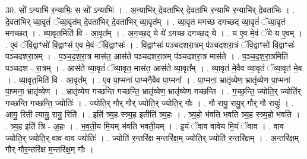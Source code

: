 \documentclass[17pt]{extarticle}
\begin{document}
30. सो᳚ ऽन्याभि॑ र॒न्याभिः॒ स सो᳚ ऽन्याभिः॑ । . अ॒न्याभि॑र् दे॒वता॑भिर् दे॒वता॑भि र॒न्याभि॑ र॒न्याभि॑र् दे॒वता॑भिः । . दे॒वता॑भिर् व्या॒वृतं॑ ॅव्या॒वृत॑म् दे॒वता॑भिर् दे॒वता॑भिर् व्या॒वृत᳚म् । . व्या॒वृत॑ मगच्छ दगच्छद् व्या॒वृतं॑ ॅव्या॒वृत॑ मगच्छत् । . व्या॒वृत॒मिति॑ वि - आ॒वृत᳚म् । . अ॒ग॒च्छ॒द् ये ये॑ ऽगच्छ दगच्छ॒द् ये । . य ए॒व मे॒वं ॅये य ए॒वम् । . ए॒वं ॅवि॒द्वाꣳसो॑ वि॒द्वाꣳस॑ ए॒व मे॒वं ॅवि॒द्वाꣳसः॑ । . वि॒द्वाꣳसः॑ पञ्चदशरा॒त्रम् प॑ञ्चदशरा॒त्रं ॅवि॒द्वाꣳसो॑ वि॒द्वाꣳसः॑ पञ्चदशरा॒त्रम् । . प॒ञ्च॒द॒श॒रा॒त्र मास॑त॒ आस॑ते पञ्चदशरा॒त्रम् प॑ञ्चदशरा॒त्र मास॑ते । . प॒ञ्च॒द॒श॒रा॒त्रमिति॑ पञ्चदश - रा॒त्रम् । . आस॑ते व्या॒वृतं॑ ॅव्या॒वृत॒ मास॑त॒ आस॑ते व्या॒वृत᳚म् । . व्या॒वृत॑ मे॒वैव व्या॒वृतं॑ ॅव्या॒वृत॑ मे॒व । . व्या॒वृत॒मिति॑ वि - आ॒वृत᳚म् । . ए॒व पा॒प्मना॑ पा॒प्मनै॒वैव पा॒प्मना᳚ । . पा॒प्मना॒ भ्रातृ॑व्येण॒ भ्रातृ॑व्येण पा॒प्मना॑ पा॒प्मना॒ भ्रातृ॑व्येण । . भ्रातृ॑व्येण गच्छन्ति गच्छन्ति॒ भ्रातृ॑व्येण॒ भ्रातृ॑व्येण गच्छन्ति । . ग॒च्छ॒न्ति॒ ज्योति॒र् ज्योति॑र् गच्छन्ति गच्छन्ति॒ ज्योतिः॑ । . ज्योति॒र् गौर् गौर् ज्योति॒र् ज्योति॒र् गौः । . गौ रायु॒ रायु॒र् गौर् गौ रायुः॑ । . आयु॒ रिती त्यायु॒ रायु॒ रिति॑ । . इति॑ त्र्य॒ह स्त्र्य॒ह इतीति॑ त्र्य॒हः । . त्र्य॒हो भ॑वति भवति त्र्य॒ह स्त्र्य॒हो भ॑वति । . त्र्य॒ह इति॑ त्रि - अ॒हः । . भ॒व॒ती॒य मि॒यम् भ॑वति भवती॒यम् । . इ॒यं ॅवाव वावेय मि॒यं ॅवाव । . वाव ज्योति॒र् ज्योति॒र् वाव वाव ज्योतिः॑ । . ज्योति॑ र॒न्तरि॑क्ष म॒न्तरि॑क्ष॒म् ज्योति॒र् ज्योति॑ र॒न्तरि॑क्षम् । . अ॒न्तरि॑क्ष॒म् गौर् गौर॒न्तरि॑क्ष म॒न्तरि॑क्ष॒म् गौः । \newline
\end{document}
